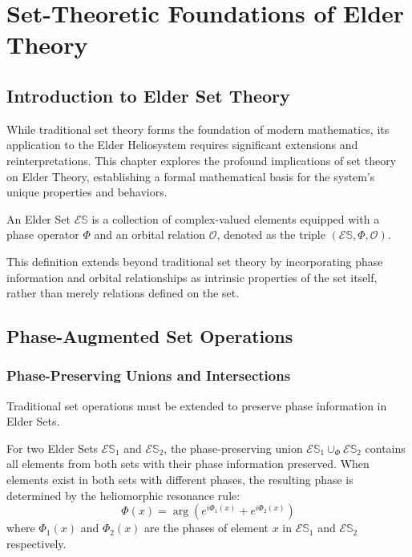 \chapter{Set-Theoretic Foundations of Elder Theory}

\section{Introduction to Elder Set Theory}

While traditional set theory forms the foundation of modern mathematics, its application to the Elder Heliosystem requires significant extensions and reinterpretations. This chapter explores the profound implications of set theory on Elder Theory, establishing a formal mathematical basis for the system's unique properties and behaviors.

\begin{definition}
An Elder Set $\mathcal{E}\mathbb{S}$ is a collection of complex-valued elements equipped with a phase operator $\Phi$ and an orbital relation $\mathcal{O}$, denoted as the triple $(\mathcal{E}\mathbb{S}, \Phi, \mathcal{O})$.
\end{definition}

This definition extends beyond traditional set theory by incorporating phase information and orbital relationships as intrinsic properties of the set itself, rather than merely relations defined on the set.

\section{Phase-Augmented Set Operations}

\subsection{Phase-Preserving Unions and Intersections}

Traditional set operations must be extended to preserve phase information in Elder Sets.

\begin{definition}
For two Elder Sets $\mathcal{E}\mathbb{S}_1$ and $\mathcal{E}\mathbb{S}_2$, the phase-preserving union $\mathcal{E}\mathbb{S}_1 \cup_{\Phi} \mathcal{E}\mathbb{S}_2$ contains all elements from both sets with their phase information preserved. When elements exist in both sets with different phases, the resulting phase is determined by the heliomorphic resonance rule:
\begin{equation}
\Phi(x) = \arg\left(e^{i\Phi_1(x)} + e^{i\Phi_2(x)}\right)
\end{equation}
where $\Phi_1(x)$ and $\Phi_2(x)$ are the phases of element $x$ in $\mathcal{E}\mathbb{S}_1$ and $\mathcal{E}\mathbb{S}_2$ respectively.
\end{definition}

